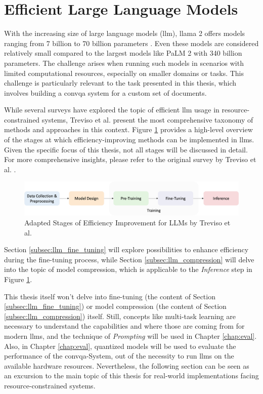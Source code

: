 \section{Efficient Large Language Models}
\label{sec:efficient_llm}

With the increasing size of large language models (\gls{llm}), \gls{llama} 2 offers models ranging from 7 billion to 70 billion parameters \cite{touvron_llama_2023}. Even these models are considered relatively small compared to the largest models like PaLM 2 \cite{anil_palm_2023} with 340 billion parameters. The challenge arises when running such models in scenarios with limited computational resources, especially on smaller domains or tasks. This challenge is particularly relevant to the task presented in this thesis, which involves building a \gls{convqa} system for a custom set of documents.

While several surveys \cite{ling_domain_2023, zhao_survey_2023} have explored the topic of efficient \gls{llm} usage in resource-constrained systems, Treviso et al. \cite{treviso_efficient_2023} present the most comprehensive taxonomy of methods and approaches in this context. Figure \ref{fig:llm_taxonomy} provides a high-level overview of the stages at which efficiency-improving methods can be implemented in \gls{llm}s. Given the specific focus of this thesis, not all stages will be discussed in detail. For more comprehensive insights, please refer to the original survey by Treviso et al. \cite{treviso_efficient_2023}.

\begin{figure}
    \centering
    \includegraphics[width=\textwidth]{Grafiken/Efficient_Survey_Steps.png}
    \caption{Adapted Stages of Efficiency Improvement for LLMs by Treviso et al. \cite{treviso_efficient_2023}}
    \label{fig:llm_taxonomy}
\end{figure}

Section \ref{subsec:llm_fine_tuning} will explore possibilities to enhance efficiency during the fine-tuning process, while Section \ref{subsec:llm_compression} will delve into the topic of model compression, which is applicable to the \textit{Inference} step in Figure \ref{fig:llm_taxonomy}.

 This thesis itself won't delve into fine-tuning (the content of Section \ref{subsec:llm_fine_tuning}) or model compression (the content of Section \ref{subsec:llm_compression}) itself. Still, concepts like multi-task learning are necessary to understand the capabilities and where those are coming from for modern \gls{llm}s, and the technique of \textit{Prompting} will be used in Chapter \ref{chap:eval}. Also, in Chapter \ref{chap:eval}, quantized models will be used to evaluate the performance of the \gls{convqa}-System, out of the necessity to run \gls{llm}s on the available hardware resources. Nevertheless, the following section can be seen as an excursion to the main topic of this thesis for real-world implementations facing resource-constrained systems.


